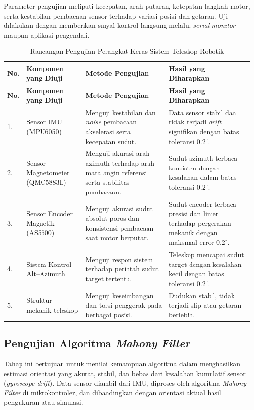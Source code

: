 Parameter pengujian meliputi kecepatan, arah putaran, ketepatan langkah motor, serta kestabilan pembacaan sensor terhadap variasi posisi dan getaran. Uji dilakukan dengan memberikan sinyal kontrol langsung melalui \textit{serial monitor} maupun aplikasi pengendali.



\begin{longtable}{|b{}|p{}|p{}|p{}|}
	\caption{Rancangan Pengujian Perangkat Keras Sistem Teleskop Robotik}
	\label{table:3.ujiHardware}\\
	\hline
	\textbf{No.} & \textbf{Komponen yang Diuji} & \textbf{Metode Pengujian} & \textbf{Hasil yang Diharapkan} \\
	\hline
	\endfirsthead
	\hline
	\textbf{No.} & \textbf{Komponen yang Diuji} & \textbf{Metode Pengujian} & \textbf{Hasil yang Diharapkan} \\
	\hline
	\endhead
	
	
	1. & Sensor IMU (MPU6050) & Menguji kestabilan dan \textit{noise} pembacaan akselerasi serta kecepatan sudut. & Data sensor stabil dan tidak terjadi \textit{drift} signifikan dengan batas toleransi $0.2^\circ$. \\
	\hline
	2. & Sensor Magnetometer (QMC5883L) & Menguji akurasi arah azimuth terhadap arah mata angin referensi serta stabilitas pembacaan. & Sudut azimuth terbaca konsisten dengan kesalahan dalam batas toleransi $0.2^\circ$. \\
	\hline
	3. & Sensor Encoder Magnetik (AS5600) & Menguji akurasi sudut absolut poros dan konsistensi pembacaan saat motor berputar. & Sudut encoder terbaca presisi dan linier terhadap pergerakan mekanik dengan maksimal error $0.2^\circ$. \\
	\hline
	\hline
	4. & Sistem Kontrol Alt--Azimuth & Menguji respon sistem terhadap perintah sudut target tertentu. & Teleskop mencapai sudut target dengan kesalahan kecil dengan batas toleransi $0.2^\circ$. \\
	\hline
	5. & Struktur mekanik teleskop & Menguji keseimbangan dan torsi penggerak pada berbagai posisi. & Dudukan stabil, tidak terjadi slip atau getaran berlebih. \\
	\hline
	
	
\end{longtable}

\subsection{Pengujian Algoritma \textit{Mahony Filter}}
Tahap ini bertujuan untuk menilai kemampuan algoritma dalam menghasilkan estimasi orientasi yang akurat, stabil, dan bebas dari kesalahan kumulatif sensor (\textit{gyroscope drift}). Data sensor diambil dari IMU, diproses oleh algoritma \textit{Mahony Filter} di mikrokontroler, dan dibandingkan dengan orientasi aktual hasil pengukuran atau simulasi. \par


